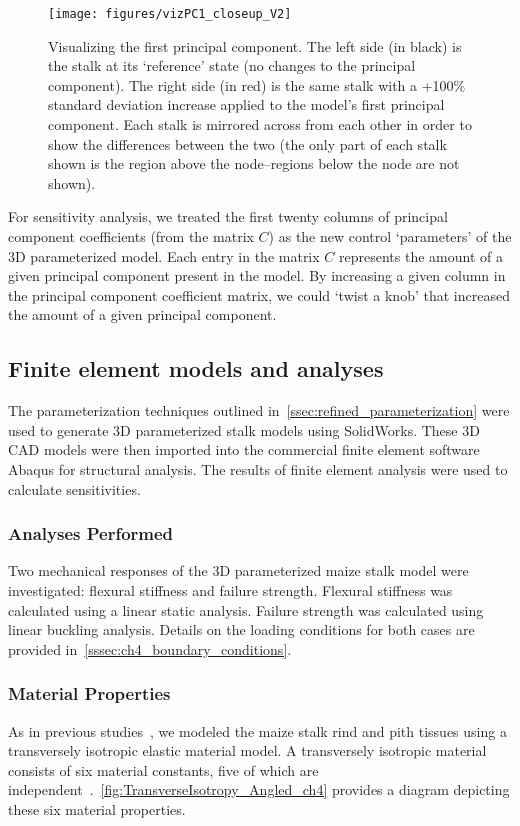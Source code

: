 \begin{figure}[htbp]
	\centering
	\texttt{[image: figures/vizPC1\_closeup\_V2]}
	\caption[Visualizing the first principal component.]{Visualizing the first principal component. The left side (in black) is the stalk at its ‘reference’ state (no changes to the principal component). The right side (in red) is the same stalk with a +100\% standard deviation increase applied to the model’s first principal component. Each stalk is mirrored across from each other in order to show the differences between the two (the only part of each stalk shown is the region above the node–regions below the node are not shown).}
	\label{fig:vizPC1_closeup_V2}
\end{figure}

For sensitivity analysis, we treated the first twenty columns of principal component coefficients (from the matrix ${C}$) as the new control ‘parameters’ of the 3D parameterized model. Each entry in the matrix ${C}$ represents the amount of a given principal component present in the model. By increasing a given column in the principal component coefficient matrix, we could ‘twist a knob’ that increased the amount of a given principal component. 

\subsection{Finite element models and analyses}
\label{ssec:finite_element_models_and_analyses}
The parameterization techniques outlined in~\cref{ssec:refined_parameterization} were used to generate 3D parameterized stalk models using SolidWorks. These 3D CAD models were then imported into the commercial finite element software Abaqus for structural analysis. The results of finite element analysis were used to calculate sensitivities.

\subsubsection{Analyses Performed}
\label{sssec:analyses_performed}
Two mechanical responses of the 3D parameterized maize stalk model were investigated: flexural stiffness and failure strength. Flexural stiffness was calculated using a linear static analysis. Failure strength was calculated using linear buckling analysis. Details on the loading conditions for both cases are provided in~\cref{sssec:ch4_boundary_conditions}. 

\subsubsection{Material Properties}
\label{sssec:ch4_material_properties}
As in previous studies~, we modeled the maize stalk rind and pith tissues using a transversely isotropic elastic material model. A transversely isotropic material consists of six material constants, five of which are independent~.~\cref{fig:TransverseIsotropy_Angled_ch4} provides a diagram depicting these six material properties.

